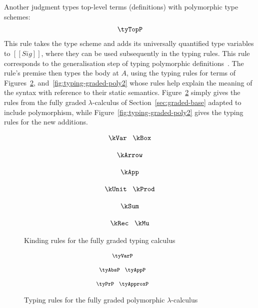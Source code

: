 Another judgment types top-level terms (definitions) with polymorphic type
schemes:
\begin{align*}
\tyTopP
\end{align*}
This rule takes the type scheme and adds its universally quantified type
variables to $[[ Sig ]]$, where they can be used subsequently in the typing
rules. This rule corresponds to the generalisation step of typing polymorphic
definitions~\citep{milner1978theory}. The rule's premise then types the body at
$A$, using the typing rules for terms of Figures~\ref{fig:typing-graded-poly1},
and~\ref{fig:typing-graded-poly2} whose rules help explain the meaning of the
syntax with reference to their static semantics. Figure~\ref{fig:typing-graded-poly1} 
simply gives the rules from the fully graded $\lambda$-calculus of Section~\ref{sec:graded-base}
adapted to include polymorphism, while Figure~\ref{fig:typing-graded-poly2} gives the
typing rules for the new additions.
\begin{figure}[t]
    \begin{align*}
      {{
    \hspace{0em}\begin{array}{c}
        \kVar 
        \;\;\;
        \kBox 
        \\[1.25em]
        \kArrow
        \\[1.25em]
        \kApp 
        \\[1.25em]
        \kUnit
        \;\;\;
        \kProd 
        \\[1.25em]
        \kSum
        \\[1.25em]
        \kRec
        \;\;\; 
        \kMu
    \end{array}
      }}
    \end{align*}
    \caption{Kinding rules for the fully graded typing calculus}
    \label{figure:kinding}
\end{figure}

\begin{figure}[t]
    \begin{align*}
    {\footnotesize{
    \hspace{-2.5em}
    \begin{array}{c}
    \tyVarP
    \\[1.25em]
    \tyAbsP
    \;\;\;
    \tyAppP
        \\[1.25em]
    \tyPrP
    \;\;\;
    \tyApproxP
    \end{array}
    }}
    \end{align*}
    \caption{Typing rules for the fully graded polymorphic $\lambda$-calculus}
    \label{fig:typing-graded-poly1}
\end{figure}

